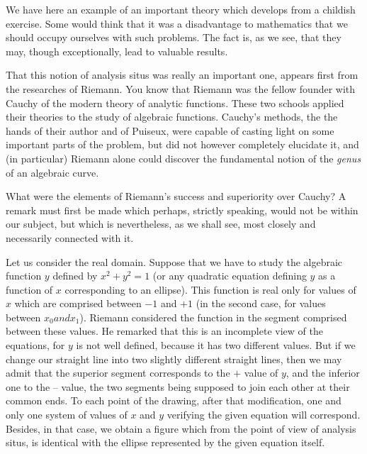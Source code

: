 \documentclass[12pt,oneside]{book}
\begin{document}
We have here an example of an important theory which develops from a childish exercise. Some would think that it was a disadvantage to mathematics that we should occupy ourselves with such problems. The fact is, as we see, that they may, though exceptionally, lead to valuable results. \par 

That this notion of analysis situs was really an important one, appears first from the researches of Riemann. You know that Riemann was the fellow founder with Cauchy of the modern theory of analytic functions. These two schools applied their theories to the study of algebraic functions. Cauchy's methods, the the hands of their author and of Puiseux, were capable of casting light on some important parts of the problem, but did not however completely elucidate it, and (in particular) Riemann alone could discover the fundamental notion of the \textit{genus} of an algebraic curve. \par 

What were the elements of Riemann's success and superiority over Cauchy? A remark must first be made which perhaps, strictly speaking, would not be within our subject, but which is nevertheless, as we shall see, most closely and necessarily connected with it. \par 

Let us consider the real domain. Suppose that we have to study the algebraic function $y$ defined by $x^2+y^2=1$ (or any quadratic equation defining $y$ as a function of $x$ corresponding to an ellipse). This function is real only for values of $x$ which are comprised between $-1$ and $+1$ (in the second case, for values between $x_0 and x_1$). Riemann considered the function in the segment comprised between these values. He remarked that this is an incomplete view of the equations, for $y$ is not well defined, because it has two different values. But if we change our straight line into two slightly different straight lines, then we may admit that the superior segment corresponds to the $+$ value of $y$, and the inferior one to the -- value, the two segments being supposed to join each other at their common ends. To each point of the drawing, after that modification, one and only one system of values of $x$ and $y$ verifying the given equation will correspond. Besides, in that case, we obtain a figure which from the point of view of analysis situs, is identical with the ellipse represented by the given equation itself. \par 
\end{document}
